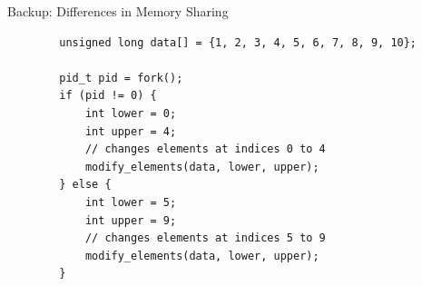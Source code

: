\documentclass[aspectratio=169, usenames, dvipsnames]{beamer}
\begin{document}
\begin{frame}[fragile]{Backup: Differences in Memory Sharing}
    \begin{verbatim}
        unsigned long data[] = {1, 2, 3, 4, 5, 6, 7, 8, 9, 10};

        pid_t pid = fork();
        if (pid != 0) {
            int lower = 0;
            int upper = 4;
            // changes elements at indices 0 to 4
            modify_elements(data, lower, upper);
        } else {
            int lower = 5;
            int upper = 9;
            // changes elements at indices 5 to 9
            modify_elements(data, lower, upper);
        }
    \end{verbatim}

\end{frame}
\end{document}
